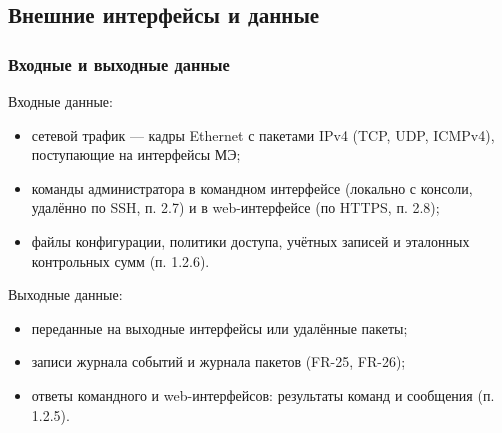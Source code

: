 \documentclass[13pt,a4paper,final]{article}
\begin{document}
	\subsection{Внешние интерфейсы и данные}
	\subsubsection{Входные и выходные данные}
	Входные данные:
	\begin{itemize}
		\item сетевой трафик — кадры Ethernet с пакетами IPv4 (TCP, UDP, ICMPv4), поступающие на интерфейсы МЭ;
		\item команды администратора в командном интерфейсе (локально с консоли, удалённо по SSH, п. 2.7) и в web-интерфейсе (по HTTPS, п. 2.8);
		\item файлы конфигурации, политики доступа, учётных записей и эталонных контрольных сумм (п. 1.2.6).
	\end{itemize}
	
	Выходные данные:
	\begin{itemize}
		\item переданные на выходные интерфейсы или удалённые пакеты;
		\item записи журнала событий и журнала пакетов (FR-25, FR-26);
		\item ответы командного и web-интерфейсов: результаты команд и сообщения (п. 1.2.5).
	\end{itemize}
	
\end{document}
